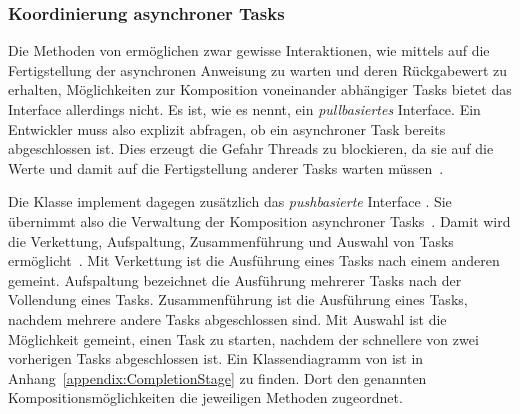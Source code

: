 \subsubsection{Koordinierung asynchroner Tasks}\label{sec:CompletableFuture}

Die Methoden von  ermöglichen zwar gewisse Interaktionen, wie mittels  auf die Fertigstellung der asynchronen Anweisung zu warten und deren Rückgabewert zu erhalten, Möglichkeiten zur Komposition voneinander abhängiger Tasks bietet das Interface allerdings nicht. Es ist, wie \textcite[S.~240]{Hettel2016} es nennt, ein \emph{pullbasiertes} Interface. Ein Entwickler muss also explizit abfragen, ob ein asynchroner Task bereits abgeschlossen ist. Dies erzeugt die Gefahr Threads zu blockieren, da sie auf die Werte und damit auf die Fertigstellung anderer Tasks warten müssen~\cite[S.~239]{Hettel2016}.

Die Klasse  implement dagegen zusätzlich das \emph{pushbasierte} Interface . Sie übernimmt also die Verwaltung der Komposition asynchroner Tasks~\cite[S.~240~ff.]{Hettel2016}. Damit wird die Verkettung, Aufspaltung, Zusammenführung und Auswahl von Tasks ermöglicht~\cite[S.~250~ff.]{Hettel2016}. Mit Verkettung ist die Ausführung eines Tasks nach einem anderen gemeint. Aufspaltung bezeichnet die Ausführung mehrerer Tasks nach der Vollendung eines Tasks. Zusammenführung ist die Ausführung eines Tasks, nachdem mehrere andere Tasks abgeschlossen sind. Mit Auswahl ist die Möglichkeit gemeint, einen Task zu starten, nachdem der schnellere von zwei vorherigen Tasks abgeschlossen ist. Ein Klassendiagramm von  ist in Anhang~\vref{appendix:CompletionStage} zu finden. Dort den genannten Kompositionsmöglichkeiten die jeweiligen Methoden zugeordnet.